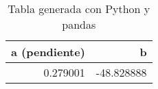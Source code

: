 \begin{table}
\caption{Tabla generada con Python y pandas}
\label{tab:datos}
\begin{tabular}{rr}
\toprule
a (pendiente) & b \\
\midrule
0.279001 & -48.828888 \\
\bottomrule
\end{tabular}
\end{table}
